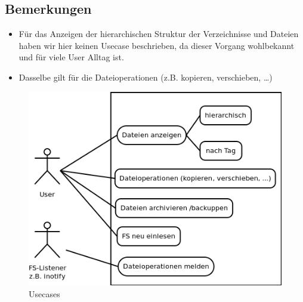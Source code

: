 \documentclass[10pt,paper=a4,final]{scrartcl}
\begin{document}
\subsection{Bemerkungen}
\begin{itemize}
	\item F\"ur das Anzeigen der hierarchischen Struktur der Verzeichnisse und Dateien haben wir hier keinen Usecase beschrieben, da dieser Vorgang wohlbekannt und f\"ur viele User Alltag ist.
	\item Dasselbe gilt f\"ur die Dateioperationen (z.B. kopieren, verschieben, …)
\end{itemize}
\begin{figure}[h!]
    \includegraphics[scale=0.5]{usecases.png}
    \caption{Usecases}
\end{figure}
\end{document}
